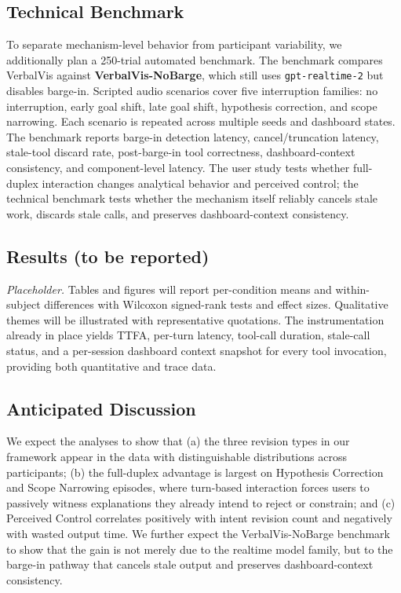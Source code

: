 \documentclass[journal]{IEEEtran}
\begin{document}
\subsection{Technical Benchmark}
To separate mechanism-level behavior from participant variability, we additionally plan a 250-trial automated benchmark. The benchmark compares VerbalVis against \textbf{VerbalVis-NoBarge}, which still uses \texttt{gpt-realtime-2} but disables barge-in. Scripted audio scenarios cover five interruption families: no interruption, early goal shift, late goal shift, hypothesis correction, and scope narrowing. Each scenario is repeated across multiple seeds and dashboard states. The benchmark reports barge-in detection latency, cancel/truncation latency, stale-tool discard rate, post-barge-in tool correctness, dashboard-context consistency, and component-level latency. The user study tests whether full-duplex interaction changes analytical behavior and perceived control; the technical benchmark tests whether the mechanism itself reliably cancels stale work, discards stale calls, and preserves dashboard-context consistency.

\subsection{Results (to be reported)}
\emph{Placeholder.} Tables and figures will report per-condition means and within-subject differences with Wilcoxon signed-rank tests and effect sizes. Qualitative themes will be illustrated with representative quotations. The instrumentation already in place yields TTFA, per-turn latency, tool-call duration, stale-call status, and a per-session dashboard context snapshot for every tool invocation, providing both quantitative and trace data.

\subsection{Anticipated Discussion}
We expect the analyses to show that (a) the three revision types in our framework appear in the data with distinguishable distributions across participants; (b) the full-duplex advantage is largest on Hypothesis Correction and Scope Narrowing episodes, where turn-based interaction forces users to passively witness explanations they already intend to reject or constrain; and (c) Perceived Control correlates positively with intent revision count and negatively with wasted output time. We further expect the VerbalVis-NoBarge benchmark to show that the gain is not merely due to the realtime model family, but to the barge-in pathway that cancels stale output and preserves dashboard-context consistency.
\end{document}
